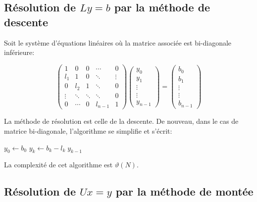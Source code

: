 \documentclass{article}
\begin{document}
\subsection{Résolution de $ L y=b$ par la méthode de descente}

Soit le système d'équations linéaires où la matrice associée est bi-diagonale inférieure:

\begin{equation}
\begin{pmatrix}
    1 & 0 & 0 & \cdots & 0 \\
    l_1 & 1 & 0 & \ddots & \vdots \\
    0 & l_2 & 1 & \ddots & 0 \\
    \vdots & \ddots & \ddots & \ddots & 0 \\
    0 & \cdots & 0 & l_{n-1} & 1
\end{pmatrix}
\begin{pmatrix}
   y_0 \\
   y_1 \\
    \vdots\\
    \vdots \\
    y_{n-1}
\end{pmatrix}
=
\begin{pmatrix}
   b_0 \\
   b_1 \\
    \vdots\\
    \vdots \\
    b_{n-1}
\end{pmatrix}
\end{equation}

La méthode de résolution est celle de la descente. De nouveau, dans le cas de matrice bi-diagonale,
l'algorithme se simplifie et s'écrit:

\begin{algorithmic}[1]
\State $y_0 \gets b_0$
 \State $y_k \gets b_k-l_k \; y_{k-1}$
\EndFor                 
\EndFunction
\end{algorithmic}

La complexité de cet algorithme est $\vartheta(N)$.

\subsection{Résolution de $ U x= y$ par la méthode de montée}
\end{document}
